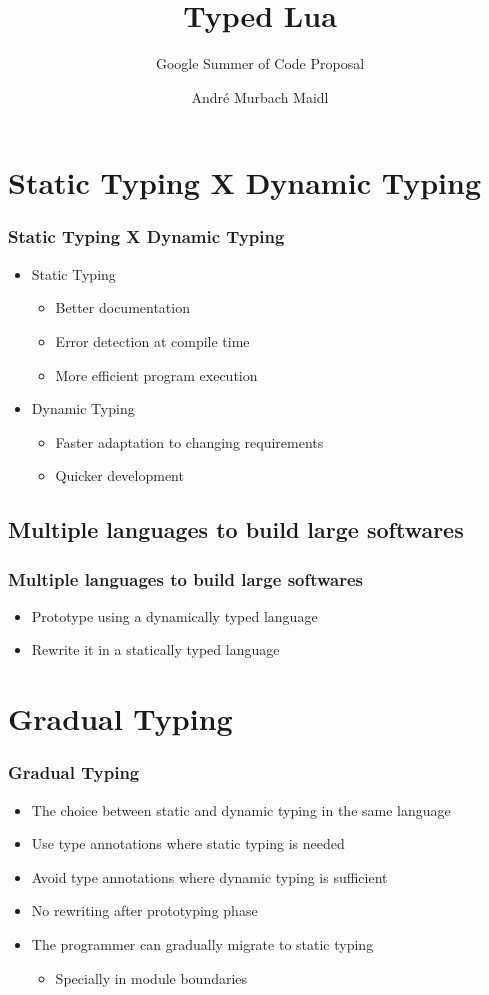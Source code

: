\documentclass{beamer}
\begin{document}
\title{Typed Lua}
\subtitle{Google Summer of Code Proposal}
\author{André Murbach Maidl}
\date{}

\frame{\titlepage}

\section{Static Typing X Dynamic Typing}
\begin{frame}
\frametitle{Static Typing X Dynamic Typing}
\begin{itemize}
\item Static Typing
\begin{itemize}
\item Better documentation
\item Error detection at compile time
\item More efficient program execution
\end{itemize}
\item Dynamic Typing
\begin{itemize}
\item Faster adaptation to changing requirements
\item Quicker development
\end{itemize}
\end{itemize}
\end{frame}

\subsection{Multiple languages to build large softwares}
\begin{frame}
\frametitle{Multiple languages to build large softwares}
\begin{itemize}
\item Prototype using a dynamically typed language
\item Rewrite it in a statically typed language
\end{itemize}
\end{frame}

\section{Gradual Typing}
\begin{frame}
\frametitle{Gradual Typing}
\begin{itemize}
\item The choice between static and dynamic typing in the same language
\item Use type annotations where static typing is needed
\item Avoid type annotations where dynamic typing is sufficient
\item No rewriting after prototyping phase
\item The programmer can gradually migrate to static typing
\begin{itemize}
\item Specially in module boundaries
\end{itemize}
\end{itemize}
\end{frame}
\end{document}
